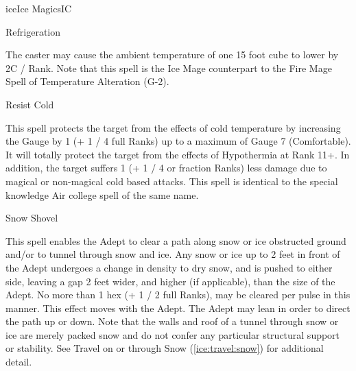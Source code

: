 \begin{college}[1.5]{ice}{Ice Magics}{IC}
\begin{spell}[G-5]{Refrigeration}
\begin{effects}
The caster may cause the ambient temperature of one 15  
foot cube to lower by 2\textdegree C / Rank. Note that this spell is
the Ice Mage counterpart to the Fire Mage Spell of Temperature
Alteration (G-2).
\end{effects}
\end{spell}

\begin{spell}[G-6]{Resist Cold}

\begin{effects}
This spell protects the target from the effects of cold temperature by
increasing the Gauge by 1 (+ 1 / 4 full Ranks) up to a maximum of
Gauge 7 (Comfortable). It will totally protect the target from the
effects of Hypothermia at Rank 11+. In addition, the target suffers 1
(+ 1 / 4 or fraction Ranks) less damage due to magical or non-magical
cold based attacks. This spell is identical to the special knowledge
Air college spell of the same name.
\end{effects}
\end{spell}

\begin{spell}[G-7]{Snow Shovel}

\begin{effects}
This spell enables the Adept to clear a path along snow or ice
obstructed ground and/or to tunnel through snow and ice.  Any snow or
ice up to 2 feet in front of the Adept undergoes a change in density
to dry snow, and is pushed to either side, leaving a gap 2 feet wider,
and higher (if applicable), than the size of the Adept.  No more than
1 hex (+ 1 / 2 full Ranks), may be cleared per pulse in this manner.
This effect moves with the Adept.  The Adept may lean in order to
direct the path up or down.  Note that the walls and roof of a tunnel
through snow or ice are merely packed snow and do not confer any
particular structural support or stability.  See Travel on or through
Snow (\ref{ice:travel:snow}) for additional detail.
\end{effects}
\end{spell}


\end{college}
